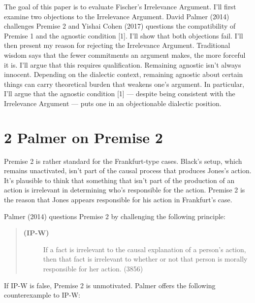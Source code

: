 \documentclass[a4paper,12pt]{article}
\begin{document}
The goal of this paper is to evaluate Fischer's Irrelevance Argument. I'll first examine two objections to the Irrelevance Argument. David Palmer (2014) challenges Premise 2 and Yishai Cohen (2017) questions the compatibility of Premise 1 and the agnostic condition [1]. I'll show that both objections fail. I'll then present my reason for rejecting the Irrelevance Argument. Traditional wisdom says that the fewer commitments an argument makes, the more forceful it is. I'll argue that this requires qualification. Remaining agnostic isn't always innocent. Depending on the dialectic context, remaining agnostic about certain things can carry theoretical burden that weakens one's argument. In particular, I'll argue that the agnostic condition [1] --- despite being consistent with the Irrelevance Argument --- puts one in an objectionable dialectic position.

\section*{2 Palmer on Premise 2}

Premise 2 is rather standard for the Frankfurt-type cases. Black's setup, which remains unactivated, isn't part of the causal process that produces Jones's action. It's plausible to think that something that isn't part of the production of an action is irrelevant in determining who's responsible for the action. Premise 2 is the reason that Jones appears responsible for his action in Frankfurt's case.

Palmer (2014) questions Premise 2 by challenging the following principle:

\begin{quote}
\begin{description}
\item[\textbf{(IP-W)}] If a fact is irrelevant to the causal explanation of a person's action, then that fact is irrelevant to whether or not that person is morally responsible for her action. (3856)
\end{description}
\end{quote}

If IP-W is false, Premise 2 is unmotivated. Palmer offers the following counterexample to IP-W:
\end{document}
